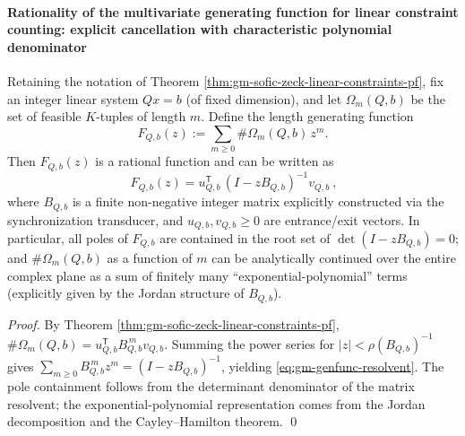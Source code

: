 \paragraph{Rationality of the multivariate generating function for linear constraint counting: explicit cancellation with characteristic polynomial denominator}
\begin{theorem}\label{thm:gm-linear-constraints-genfunc-rational}
Retaining the notation of Theorem \ref{thm:gm-sofic-zeck-linear-constraints-pf}, fix an integer linear system \(Qx=b\) (of fixed dimension), and let \(\Omega_m(Q,b)\) be the set of feasible \(K\)-tuples of length \(m\).
Define the length generating function
\[
F_{Q,b}(z):=\sum_{m\ge 0}\#\Omega_m(Q,b)\,z^m.
\]
Then \(F_{Q,b}(z)\) is a rational function and can be written as
\begin{equation}\label{eq:gm-genfunc-resolvent}
\boxed{\
F_{Q,b}(z)
=u_{Q,b}^{\mathsf T}\,(I-zB_{Q,b})^{-1}v_{Q,b}\ } ,
\end{equation}
where \(B_{Q,b}\) is a finite non-negative integer matrix explicitly constructed via the synchronization transducer, and \(u_{Q,b},v_{Q,b}\ge 0\) are entrance/exit vectors.
In particular, all poles of \(F_{Q,b}\) are contained in the root set of
\(
\det(I-zB_{Q,b})=0
\);
and \(\#\Omega_m(Q,b)\) as a function of \(m\) can be analytically continued over the entire complex plane as a sum of finitely many ``exponential-polynomial'' terms (explicitly given by the Jordan structure of \(B_{Q,b}\)).
\end{theorem}

\begin{proof}
By Theorem \ref{thm:gm-sofic-zeck-linear-constraints-pf}, \(\#\Omega_m(Q,b)=u_{Q,b}^{\mathsf T}B_{Q,b}^{\,m}v_{Q,b}\).
Summing the power series for \(|z|<\rho(B_{Q,b})^{-1}\) gives
\(
\sum_{m\ge 0}B_{Q,b}^{\,m}z^m=(I-zB_{Q,b})^{-1}
\),
yielding \eqref{eq:gm-genfunc-resolvent}.
The pole containment follows from the determinant denominator of the matrix resolvent; the exponential-polynomial representation comes from the Jordan decomposition and the Cayley--Hamilton theorem. \qed
\end{proof}

